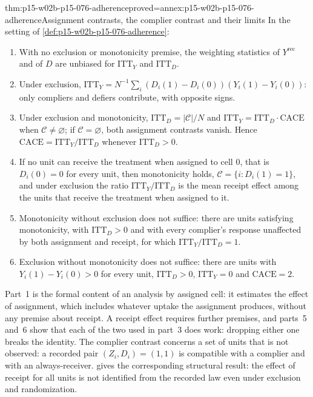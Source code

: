 \begin{hbtheorem}{thm:p15-w02b-p15-076-adherence}{proved=annex:p15-w02b-p15-076-adherence}{Assignment contrasts, the complier contrast and their limits}
In the setting of \cref{def:p15-w02b-p15-076-adherence}:
\begin{enumerate}
\item With no exclusion or monotonicity premise, the weighting statistics
      of \(Y^{\mathrm{rec}}\) and of \(D\) are unbiased for
      \(\mathrm{ITT}_Y\) and \(\mathrm{ITT}_D\).
\item Under exclusion,
      \(\mathrm{ITT}_Y=N^{-1}\sum_i(D_i(1)-D_i(0))(Y_i(1)-Y_i(0))\): only
      compliers and defiers contribute, with opposite signs.
\item Under exclusion and monotonicity, \(\mathrm{ITT}_D=|\mathcal C|/N\)
      and \(\mathrm{ITT}_Y=\mathrm{ITT}_D\cdot\mathrm{CACE}\) when
      \(\mathcal C\ne\varnothing\); if \(\mathcal C=\varnothing\), both
      assignment contrasts vanish. Hence
      \(\mathrm{CACE}=\mathrm{ITT}_Y/\mathrm{ITT}_D\) whenever
      \(\mathrm{ITT}_D>0\).
\item If no unit can receive the treatment when assigned to cell \(0\),
      that is \(D_i(0)=0\) for every unit, then monotonicity holds,
      \(\mathcal C=\{i:D_i(1)=1\}\), and under exclusion the ratio
      \(\mathrm{ITT}_Y/\mathrm{ITT}_D\) is the mean receipt effect among the
      units that receive the treatment when assigned to it.
\item Monotonicity without exclusion does not suffice: there are units
      satisfying monotonicity, with \(\mathrm{ITT}_D>0\) and with every
      complier's response unaffected by both assignment and receipt, for
      which \(\mathrm{ITT}_Y/\mathrm{ITT}_D=1\).
\item Exclusion without monotonicity does not suffice: there are units with
      \(Y_i(1)-Y_i(0)>0\) for every unit, \(\mathrm{ITT}_D>0\),
      \(\mathrm{ITT}_Y=0\) and \(\mathrm{CACE}=2\).
\end{enumerate}
\end{hbtheorem}

Part~1 is the formal content of an analysis by assigned cell: it estimates
the effect of assignment, which includes whatever uptake the assignment
produces, without any premise about receipt. A receipt effect requires
further premises, and parts~5 and~6 show that each of the two used in
part~3 does work: dropping either one breaks the identity. The complier
contrast concerns a set of units that is not observed: a recorded pair
\((Z_i,D_i)=(1,1)\) is compatible with a complier and with an
always-receiver.  gives the
corresponding structural result: the effect of receipt for all units is not
identified from the recorded law even under exclusion and randomization.

